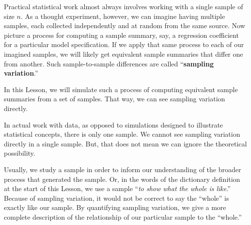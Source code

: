 \documentclass[
  letterpaper,
  DIV=11,
  numbers=noendperiod,
  oneside]{scrreprt}
\begin{document}
Practical statistical work almost always involves working with a single
sample of size \(n\). As a thought experiment, however, we can imagine
having multiple samples, each collected independently and at random from
the same source. Now picture a process for computing a sample summary,
say, a regression coefficient for a particular model specification. If
we apply that same process to each of our imagined samples, we will
likely get equivalent sample summaries that differ one from another.
Such sample-to-sample differences are called ``\textbf{sampling
variation}.''

In this Lesson, we will simulate such a process of computing equivalent
sample summaries from a set of samples. That way, we can see sampling
variation directly.

In actual work with data, as opposed to simulations designed to
illustrate statistical concepts, there is only one sample. We cannot see
sampling variation directly in a single sample. But, that does not mean
we can ignore the theoretical possibility.

Usually, we study a sample in order to inform our understanding of the
broader process that generated the sample. Or, in the words of the
dictionary definition at the start of this Lesson, we use a sample
``\emph{to show what the whole is like}.'' Because of sampling
variation, it would not be correct to say the ``whole'' is exactly like
our sample. By quantifying sampling variation, we give a more complete
description of the relationship of our particular sample to the
``whole.''
\end{document}
